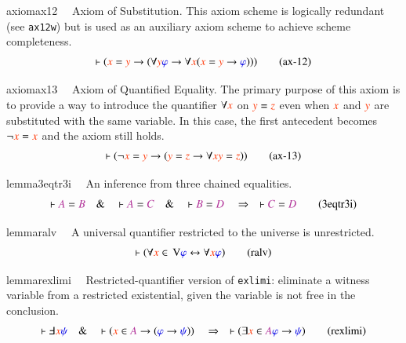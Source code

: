 \begin{restatable}{axiom}{ax12}~~ Axiom of Substitution.      This axiom scheme is logically redundant (see {\tt ax12w}) but is used as
an
     auxiliary axiom scheme to achieve scheme completeness.  ~  ~
\begin{align}
\vdash ( \msc{x} = \msc{y} \rightarrow ( \forall \msc{y} \mw{\varphi}
    \rightarrow \forall \msc{x} ( \msc{x} = \msc{y} \rightarrow \mw{\varphi} )
    ) )\label{eq:ax-12}\tag{ax-12}
\end{align}
\end{restatable}

\begin{restatable}{axiom}{ax13}~~ Axiom of Quantified Equality. 
The primary purpose of this axiom is to provide a way to introduce the
     quantifier $\forall \msc{x}$ on $\msc{y} = \msc{z}$ even when $\msc{x}$
and $\msc{y}$ are substituted
     with the same variable.  In this case, the first antecedent becomes
     $\lnot \msc{x} = \msc{x}$ and the axiom still holds.
\begin{align}
\vdash ( \lnot \msc{x} = \msc{y} \rightarrow ( \msc{y} = \msc{z} \rightarrow
    \forall \msc{x} \msc{y} = \msc{z} ) )\label{eq:ax-13}\tag{ax-13}
\end{align}
\end{restatable}

\begin{restatable}{lemma}{3eqtr3i}~~ An inference from three chained equalities.
~  ~
\begin{align}
\vdash \mc{A} = \mc{B}\quad\&\quad \vdash \mc{A} = \mc{C}\quad\&\quad \vdash
    \mc{B} = \mc{D}\quad\Rightarrow\quad \vdash \mc{C} =
    \mc{D}\label{eq:3eqtr3i}\tag{3eqtr3i}
\end{align}
\end{restatable}

\begin{restatable}{lemma}{ralv}~~ A universal quantifier restricted to the
universe is unrestricted.
\begin{align}
\vdash ( \forall \msc{x} \in \,\mathrm{V} \mw{\varphi} \leftrightarrow \forall
    \msc{x} \mw{\varphi} )\label{eq:ralv}\tag{ralv}
\end{align}
\end{restatable}

\begin{restatable}{lemma}{rexlimi}~~ Restricted-quantifier version of
\texttt{exlimi}: eliminate a witness variable from a restricted
existential, given the variable is not free in the conclusion.
\begin{align}
\vdash \Finv \msc{x} \mw{\psi}\quad\&\quad \vdash ( \msc{x} \in \mc{A}
    \rightarrow ( \mw{\varphi} \rightarrow \mw{\psi} ) )\quad\Rightarrow\quad
    \vdash ( \exists \msc{x} \in \mc{A} \mw{\varphi} \rightarrow \mw{\psi}
    )\label{eq:rexlimi}\tag{rexlimi}
\end{align}
\end{restatable}

